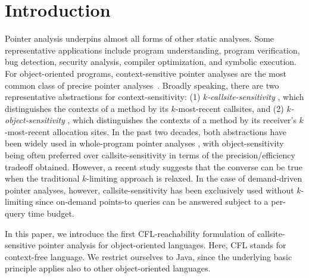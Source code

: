 \section{Introduction}
\label{sec:introduction}

Pointer analysis underpins almost all forms of other static analyses. Some representative
applications include
program understanding, program verification, bug detection,
 security analysis,
 compiler optimization, and symbolic execution. 
 For object-oriented programs, context-sensitive pointer analyses
are the most common class of precise pointer analyses~\cite{tan2017efficient,lhotak2003scaling,smaragdakis2011pick,jeon2018precise}.
 Broadly speaking, 
there are two representative abstractions
for context-sensitivity:
(1) \emph{$k$-callsite-sensitivity}
\cite{shivers1991control}, which
distinguishes the contexts of a method by its
$k$-most-recent callsites, and (2)
\emph{$k$-object-sensitivity} \cite{milanova2005parameterized,milanova2002parameterized},
which 
distinguishes the contexts of a method
by its receiver's $k$-most-recent
allocation sites. In the past two decades, both abstractions  have been widely used in
whole-program pointer analyses \cite{bravenboer2009strictly,WALA2022,naik2006effective}, with object-sensitivity
being often preferred over callsite-sensitivity  in terms of the precision/efficiency tradeoff obtained. However, a recent study \cite{JeonPOPL22}
suggests that the converse can be true when the traditional $k$-limiting approach
is relaxed.
In the case of demand-driven pointer analyses, however, callsite-sensitivity
has been exclusively used
\cite{sridharan2006refinement,shang2012demand,yan2011demand} 
without $k$-limiting since on-demand points-to queries
can be answered subject to a per-query time budget.

\begin{comment}
program understanding \cite{sridharan2007thin}, bug detection \cite{naik2006effective, Liu2018PLDI, Fan2019ICSE},
 security analysis \cite{flowdroid2014,Fan2017ISSTA, PTaint2017OOPSLA},
 compiler optimization \cite{da2006probabilistic, sui2013query}, and symbolic execution~\cite{Trabish2018ICSE, Kapus2019FSE, Trabish2020FSE}.
\end{comment}

In this paper, we introduce the first CFL-reachability formulation of callsite-sensitive pointer analysis for object-oriented
languages.
Here, CFL stands for context-free language.
We restrict ourselves to Java, since
the underlying basic principle  applies also to other object-oriented  
languages.

